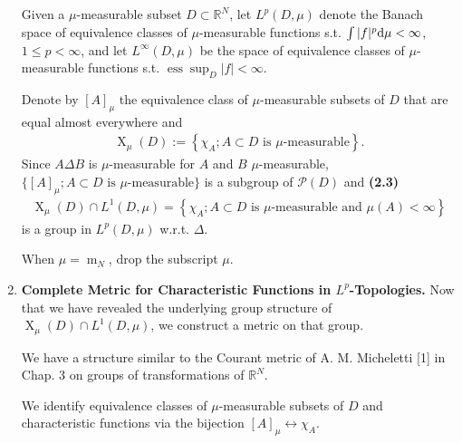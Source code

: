 \documentclass{book}
\numberwithin{equation}{section}
\begin{document}
\begin{enumerate}
    Given a $\mu$-measurable subset $D\subset\mathbb{R}^N$, let $L^p(D,\mu)$ denote the Banach space of equivalence classes of $\mu$-measurable functions s.t. $\int |f|^p{\rm d}\mu < \infty$, $1\le p < \infty$, and let $L^\infty(D,\mu)$ be the space of equivalence classes of $\mu$-measurable functions s.t. $\operatorname{ess}\sup_D |f| < \infty$.
    
    Denote by $[A]_\mu$ the equivalence class of $\mu$-measurable subsets of $D$ that are equal almost everywhere and
    \begin{align*}
        \operatorname{X}_\mu(D) := \left\{\chi_A;A\subset D \mbox{ is } \mu\mbox{-measurable}\right\}.
    \end{align*}
    Since $A\Delta B$ is $\mu$-measurable for $A$ and $B$ $\mu$-measurable, $\{[A]_\mu;A\subset D \mbox{ is } \mu\mbox{-measurable}\}$ is a subgroup of $\mathcal{P}(D)$ and \textbf{(2.3)}
    \begin{align*}
        \operatorname{X}_\mu(D)\cap L^1(D,\mu) = \left\{\chi_A;A\subset D \mbox{ is } \mu\mbox{-measurable and } \mu(A) < \infty\right\}
    \end{align*}
    is a group in $L^p(D,\mu)$ w.r.t. $\Delta$.
    
    When $\mu = \operatorname{m}_N$, drop the subscript $\mu$.
    \item \textbf{Complete Metric for Characteristic Functions in $L^p$-Topologies.} Now that we have revealed the underlying group structure of $\operatorname{X}_\mu(D)\cap L^1(D,\mu)$, we construct a metric on that group.
    
    We have a structure similar to the Courant metric of A. M. Micheletti [1] in Chap. 3 on groups of transformations of $\mathbb{R}^N$.
    
    We identify equivalence classes of $\mu$-measurable subsets of $D$ and characteristic functions via the bijection $[A]_\mu\leftrightarrow\chi_A$.
    

\end{enumerate}
\end{document}
